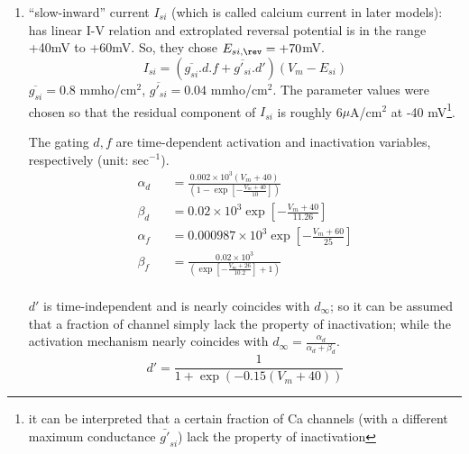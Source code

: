 \begin{itemize}
\begin{enumerate}
  \item ``slow-inward'' current $I_{si}$ (which is called calcium current in
  later models): has linear I-V relation and extroplated reversal potential is
  in the range +40mV to +60mV. So, they chose $E_{si,\rev}=+70$mV.
    \begin{equation}
      \label{eq:609}
      I_{si} = (\overline{g_{si}}.d.f + \overline{g'_{si}}.d') (V_m-E_{si})
    \end{equation}
    $\overline{g_{si}}=0.8$ mmho/cm$^2$,
    $\overline{g'_{si}}=0.04$ mmho/cm$^2$. The parameter values were
    chosen so that the residual component of $I_{si}$ is roughly 6$\mu$A/cm$^2$
    at -40 mV\footnote{it can be interpreted that a certain fraction of Ca
      channels (with a different maximum conductance $\bar{g'}_{si}$) lack the
      property of inactivation}.
    
    The gating $d,f$ are time-dependent activation and inactivation variables,
    respectively (unit: sec$^{-1}$).
    \begin{eqnarray}
      \alpha_d &&= \frac{0.002 \times
      10^3 (V_m+40)}{(1-\exp[-\frac{V_m+40}{10}])}
      \\
  \beta_d &&= 0.02\times 10^3 \exp [-\frac{V_m + 40}{11.26}] \\
  \alpha_f &&= 0.000987\times 10^3 \exp [-\frac{V_m + 60}{25}] \\
  \beta_f &&= \frac{0.02 \times 10^3}{(\exp [- \frac{V_m + 26}{10.2}] + 1)} \\
    \end{eqnarray}
    
    $d'$ is time-independent and is nearly coincides with $d_\infty$; so it can
    be assumed that a fraction of channel simply lack the property of
    inactivation; while the activation mechanism nearly coincides with
    $d_\infty=\frac{\alpha_d}{\alpha_d+\beta_d}$.
    \begin{equation}
      \label{eq:610}
      d' = \frac{1}{1+\exp(-0.15(V_m+40))}
    \end{equation}
  \end{enumerate}


\end{itemize}
